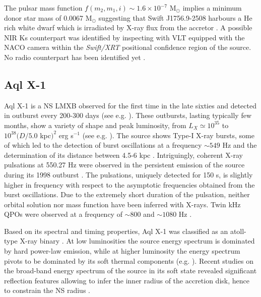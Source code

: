 \documentclass[graybox]{svmult}
\def \swiftxrt{{\em Swift/XRT\xspace}}
\begin{document}
The pulsar mass function $f(m_2,m_1,i)\sim 1.6\times 10^{-7}$ M$_\odot$ implies a minimum donor star mass of 0.0067 M$_\odot$ suggesting that Swift J1756.9-2508 harbours a He rich white dwarf which is irradiated by X-ray flux from the accretor \cite{Krimm2007}. A possible NIR Ks counterpart was identified by inspecting with VLT equipped with the NACO camera within the \swiftxrt{} positional confidence region of the source. No radio counterpart has been identified yet \cite{Possenti2007,Hessels2007}.


\subsection{Aql X-1}
Aql X-1 is a NS LMXB observed for the first time in the late sixties \cite{Friedman1967} and detected in outburst every 200-300 days (see e.g. \cite{Priedhorsky1984,Kitamoto1993, Campana2013}). These outbursts, lasting typically few months, show a variety of shape and peak luminosity, from $L_X\simeq10^{35}$ to $10^{38} (D/5.0$ kpc$)^2$ erg s$^{-1}$ (see e.g. \cite{Kuulkers2003,Campana2013}). The source shows Type-I X-ray bursts, some of which led to the detection of burst oscillations at a frequency $\sim549$ Hz \cite{Zhang1998} and the determination of its distance between 4.5-6 kpc \cite{Jonker2004}. Intriguingly, coherent X-ray pulsations at 550.27 Hz were observed in the persistent emission of the source during its 1998 outburst \cite{Casella2008}. The pulsations, uniquely detected for 150 s, is slightly higher in frequency with respect to the asymptotic frequencies obtained from the burst oscillations. Due to the extremely short duration of the pulsation, neither orbital solution nor mass function have been inferred with X-rays. Twin kHz QPOs were observed at a frequency of $\sim800$ and $\sim1080$ Hz \cite{Barret2008}. 

Based on its spectral and timing properties, Aql X-1 was classified as an atoll-type X-ray binary \cite{Hasinger1989, Reig2004}. At low luminosities the source energy spectrum is dominated by hard power-law emission, while at higher luminosity the energy spectrum pivots to be dominated by its soft thermal components (e.g. \cite{Lin2007}). Recent studies on the broad-band energy spectrum of the source in its soft state revealed significant reflection features allowing to infer the inner radius of the accretion disk, hence to constrain the NS radius \cite{Ludlam2017}. 
\end{document}
